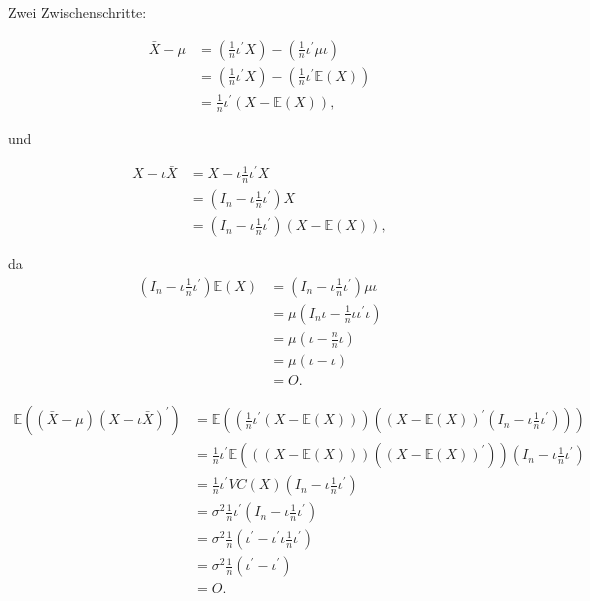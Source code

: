 \documentclass{tstextbook}
\begin{document}
\begin{example}
Zwei Zwischenschritte:

\begin{align*}
	\bar{X}-\mu & =\left(\frac{1}{n}\iota^{\prime}X\right)-\left(\frac{1}{n}\iota^{\prime}\mu\iota\right)\\
	& =\left(\frac{1}{n}\iota^{\prime}X\right)-\left(\frac{1}{n}\iota^{\prime}\mathbb{E}(X)\right)\\
	& =\frac{1}{n}\iota^{\prime}\left(X-\mathbb{E}(X)\right),
\end{align*}

und

\begin{align*}
	X-\iota\bar{X} & =X-\iota\frac{1}{n}\iota^{\prime}X\\
	& =\left(I_{n}-\iota\frac{1}{n}\iota^{\prime}\right)X\\
	& =\left(I_{n}-\iota\frac{1}{n}\iota^{\prime}\right)\left(X-\mathbb{E}(X)\right),
\end{align*}

da
\begin{align*}
	\left(I_{n}-\iota\frac{1}{n}\iota^{\prime}\right)\mathbb{E}(X) & =\left(I_{n}-\iota\frac{1}{n}\iota^{\prime}\right)\mu\iota\\
	& =\mu\left(I_{n}\iota-\frac{1}{n}\iota\iota^{\prime}\iota\right)\\
	& =\mu\left(\iota-\frac{n}{n}\iota\right)\\
	& =\mu\left(\iota-\iota\right)\\
	& =O.
\end{align*}

\begin{align*}
	\mathbb{E}\left(\left(\bar{X}-\mu\right)\left(X-\iota\bar{X}\right)^{\prime}\right) & =\mathbb{E}\left(\left(\frac{1}{n}\iota^{\prime}\left(X-\mathbb{E}(X)\right)\right)\left(\left(X-\mathbb{E}(X)\right)^{\prime}\left(I_{n}-\iota\frac{1}{n}\iota^{\prime}\right)\right)\right)\\
	& =\frac{1}{n}\iota^{\prime}\mathbb{E}\left(\left(\left(X-\mathbb{E}(X)\right)\right)\left(\left(X-\mathbb{E}(X)\right)^{\prime}\right)\right)\left(I_{n}-\iota\frac{1}{n}\iota^{\prime}\right)\\
	& =\frac{1}{n}\iota^{\prime}VC(X)\left(I_{n}-\iota\frac{1}{n}\iota^{\prime}\right)\\
	& =\sigma^{2}\frac{1}{n}\iota^{\prime}\left(I_{n}-\iota\frac{1}{n}\iota^{\prime}\right)\\
	& =\sigma^{2}\frac{1}{n}\left(\iota^{\prime}-\iota^{\prime}\iota\frac{1}{n}\iota^{\prime}\right)\\
	& =\sigma^{2}\frac{1}{n}\left(\iota^{\prime}-\iota^{\prime}\right)\\
	& =O.
\end{align*}



\end{example}
\end{document}
